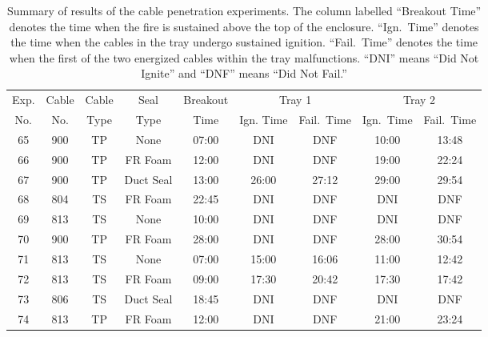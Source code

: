 \begin{table}[ht]
\centering
\caption[Summary of results of penetration experiments]{Summary of results of the cable penetration experiments. The column labelled ``Breakout Time'' denotes the time when the fire is sustained above the top of the enclosure. ``Ign.~Time'' denotes the time when the cables in the tray undergo sustained ignition. ``Fail.~Time'' denotes the time when the first of the two energized cables within the tray malfunctions. ``DNI'' means ``Did Not Ignite'' and ``DNF'' means ``Did Not Fail.'' }
\label{penetration_matrix}
\begin{tabular}{|c|c|c|c|c|c|c|c|c|}
\hline
Exp.   & Cable   & Cable    & Seal             & Breakout  & \multicolumn{2}{|c|}{Tray 1}  & \multicolumn{2}{|c|}{Tray 2}  \\ \cline{6-9}
No.    & No.     & Type     & Type             & Time      & Ign. Time  & Fail.~Time       & Ign.~Time  & Fail.~Time       \\ \hline
65     & 900     & TP       & None             & 07:00     & DNI        & DNF              & 10:00      & 13:48            \\ \hline
66     & 900     & TP       & FR Foam          & 12:00     & DNI        & DNF              & 19:00      & 22:24            \\ \hline
67     & 900     & TP       & Duct Seal        & 13:00     & 26:00      & 27:12            & 29:00      & 29:54            \\ \hline
68     & 804     & TS       & FR Foam          & 22:45     & DNI        & DNF              & DNI        & DNF              \\ \hline
69     & 813     & TS       & None             & 10:00     & DNI        & DNF              & DNI        & DNF              \\ \hline
70     & 900     & TP       & FR Foam          & 28:00     & DNI        & DNF              & 28:00      & 30:54            \\ \hline
71     & 813     & TS       & None             & 07:00     & 15:00      & 16:06            & 11:00      & 12:42            \\ \hline
72     & 813     & TS       & FR Foam          & 09:00     & 17:30      & 20:42            & 17:30      & 17:42            \\ \hline
73     & 806     & TS       & Duct Seal        & 18:45     & DNI        & DNF              & DNI        & DNF              \\ \hline
74     & 813     & TP       & FR Foam          & 12:00     & DNI        & DNF              & 21:00      & 23:24            \\ \hline

\end{tabular}
\end{table}
